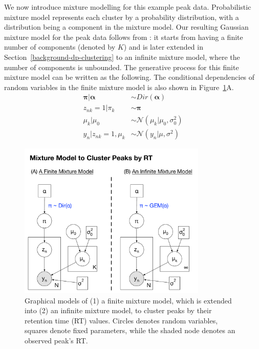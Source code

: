 We now introduce mixture modelling for this example peak data. Probabilistic mixture model represents each cluster by a probability distribution, with a distribution being a component in the mixture model. Our resulting Gaussian mixture model for the peak data follows from \cite{Rasmussen2000}: it starts from having a finite number of components (denoted by $K$) and is later extended in Section~\ref{background-dp-clustering} to an infinite mixture model, where the number of components is unbounded. The generative process for this finite mixture model can be written as the following. The conditional dependencies of random variables in the finite mixture model is also shown in Figure~\ref{fig:background-mixture-plate-diagram}A. 
\begin{equation}
\begin{aligned}
\boldsymbol{\pi} \vert \boldsymbol{\alpha} &\sim Dir(\boldsymbol{\alpha}) \\
z_{nk}=1 \vert \pi_k                                  &\sim \boldsymbol{\pi} \\
\mu_k \vert \mu_0                                    &\sim \mathcal{N}(\mu_k \vert \mu_0, \sigma_0^2) \\
y_n \vert z_{nk}=1, \mu_k                         &\sim \mathcal{N}(y_n \vert \mu, \sigma^2)
\end{aligned}
\label{eq:background-finite-mixture}
\end{equation}

\begin{figure}[tbh!]
\noindent \begin{centering}
\includegraphics[width=0.8\textwidth]{03-machine-learning/figures/mixture_model.pdf}
\par\end{centering}
\caption{\label{fig:background-mixture-plate-diagram}Graphical models of (1) a finite mixture model, which is extended into (2) an infinite mixture model, to cluster peaks by their retention time (RT) values. Circles denotes random variables, squares denote fixed parameters, while the shaded node denotes an observed peak's RT.}
\end{figure}

